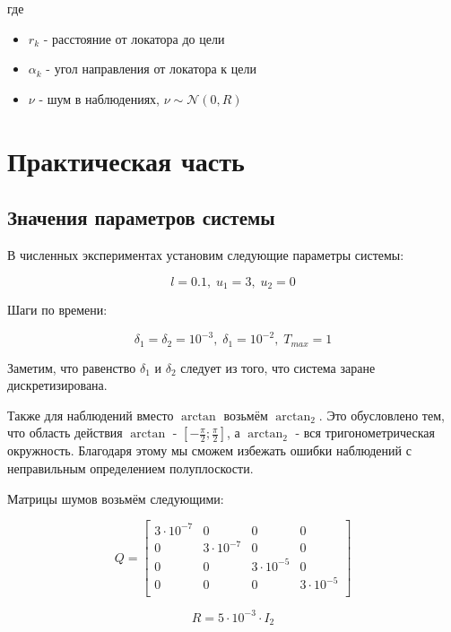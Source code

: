 \documentclass[12pt]{article}
\begin{document}
где

\begin{itemize}
	\item $r_k$ - расстояние от локатора до цели
	\item $\alpha_k$ - угол направления от локатора к цели
	\item $\nu$ - шум в наблюдениях, $\nu \sim \mathcal{N}(0, R)$
\end{itemize}

\newpage

\section{Практическая часть}

\subsection{Значения параметров системы}

В численных экспериментах установим следующие параметры системы:

\[
	l=0.1, \; u_1 = 3, \; u_2 = 0
\]

Шаги по времени:

\[
	\delta_1 = \delta_2 = 10^{-3}, \; \delta_1 = 10^{-2}, \; T_{max} = 1
\]

Заметим, что равенство $\delta_1$ и $\delta_2$ следует из того, что система заране дискретизирована.

Также для наблюдений вместо $\arctan$ возьмём $\arctan_2$. Это обусловлено тем, что область действия $\arctan$ - $[- \frac{\pi}{2}; \frac{\pi}{2} ]$, а $\arctan_2$ - вся тригонометрическая окружность. Благодаря этому мы сможем избежать ошибки наблюдений с неправильным определением полуплоскости.

Матрицы шумов возьмём следующими:

\[
	Q = \begin{bmatrix}
		3 \cdot 10^{-7} & 0                & 0                & 0                \\
		0               & 3 \cdot 10 ^{-7} & 0                & 0                \\
		0               & 0                & 3 \cdot 10 ^{-5} & 0                \\
		0               & 0                & 0                & 3 \cdot 10 ^{-5} \\
	\end{bmatrix}
\]

\[
	R = 5 \cdot 10^{-3} \cdot I_2
\]
\end{document}
